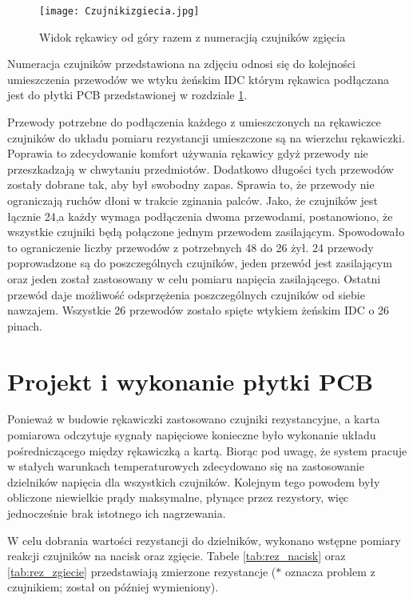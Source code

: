 \documentclass[10pt, a4paper]{article}
\begin{document}
\begin{figure}[h!]
\texttt{[image: Czujnikizgiecia.jpg]}
\caption{Widok rękawicy od góry razem z numeracjią czujników zgięcia} \label{gora}
\end{figure}

\newpage
Numeracja czujników przedstawiona na zdjęciu odnosi się do kolejności umieszczenia przewodów we wtyku żeńskim IDC którym rękawica podłączana jest do płytki PCB przedstawionej w rozdziale \ref{sec:PCB}. 

Przewody potrzebne do podłączenia każdego z umieszczonych na rękawiczce czujników do układu pomiaru rezystancji umieszczone są na wierzchu rękawiczki. Poprawia to zdecydowanie komfort używania rękawicy gdyż przewody nie przeszkadzają w chwytaniu przedmiotów. Dodatkowo długości tych przewodów zostały dobrane tak, aby był swobodny zapas. Sprawia to, że przewody nie ograniczają ruchów dłoni w trakcie zginania palców. Jako, że czujników jest łącznie 24,a każdy wymaga podłączenia dwoma przewodami, postanowiono, że wszystkie czujniki będą połączone jednym przewodem zasilającym. Spowodowało to ograniczenie liczby przewodów z potrzebnych 48 do 26 żył. 24 przewody poprowadzone są do poszczególnych czujników, jeden przewód jest zasilającym oraz jeden został zastosowany w celu pomiaru napięcia zasilającego. Ostatni przewód daje możliwość odsprzężenia poszczególnych czujników od siebie nawzajem. Wszystkie 26 przewodów zostało spięte wtykiem żeńskim IDC o 26 pinach.



\section{Projekt i wykonanie płytki PCB}
\label{sec:PCB}

Ponieważ w budowie rękawiczki zastosowano czujniki rezystancyjne, a karta pomiarowa odczytuje sygnały napięciowe konieczne było wykonanie układu pośredniczącego między rękawiczką a kartą. Biorąc pod uwagę, że system pracuje w stałych warunkach temperaturowych zdecydowano się na zastosowanie dzielników napięcia dla wszystkich czujników. Kolejnym tego powodem były obliczone niewielkie prądy maksymalne, płynące przez rezystory, więc jednocześnie brak istotnego ich nagrzewania.

W celu dobrania wartości rezystancji do dzielników, wykonano wstępne pomiary reakcji czujników na nacisk oraz zgięcie. Tabele \ref{tab:rez_nacisk} oraz \ref{tab:rez_zgiecie} przedstawiają zmierzone rezystancje ($*$ oznacza problem z czujnikiem; został on później wymieniony).
\end{document}
